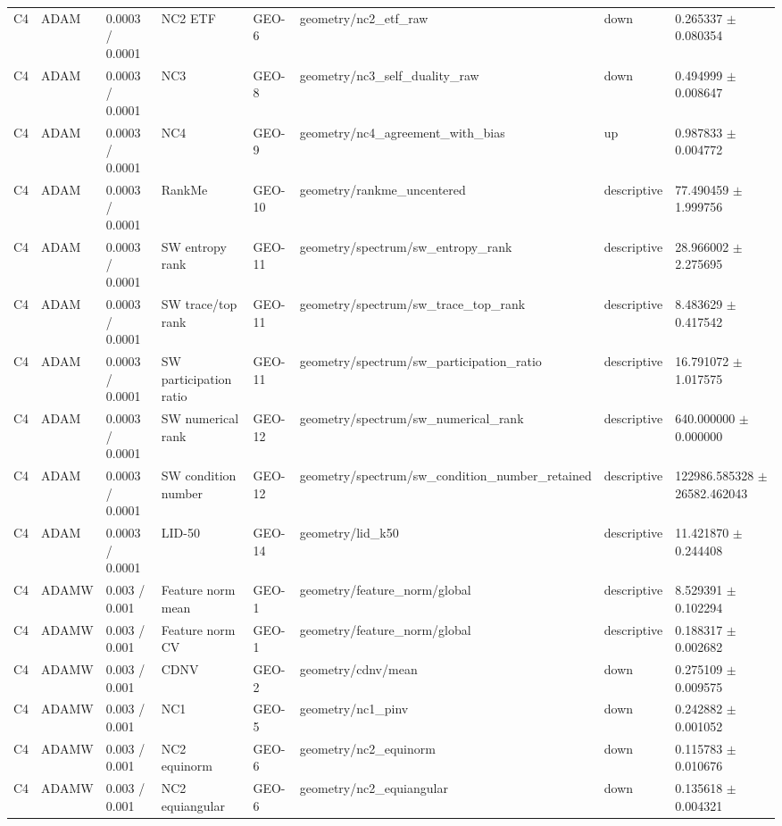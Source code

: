 \begin{longtable}{llllllll}
C4 & ADAM & 0.0003 / 0.0001 & NC2 ETF & GEO-6 & geometry/nc2\_etf\_raw & down & 0.265337 $\pm$ 0.080354 \\
C4 & ADAM & 0.0003 / 0.0001 & NC3 & GEO-8 & geometry/nc3\_self\_duality\_raw & down & 0.494999 $\pm$ 0.008647 \\
C4 & ADAM & 0.0003 / 0.0001 & NC4 & GEO-9 & geometry/nc4\_agreement\_with\_bias & up & 0.987833 $\pm$ 0.004772 \\
C4 & ADAM & 0.0003 / 0.0001 & RankMe & GEO-10 & geometry/rankme\_uncentered & descriptive & 77.490459 $\pm$ 1.999756 \\
C4 & ADAM & 0.0003 / 0.0001 & SW entropy rank & GEO-11 & geometry/spectrum/sw\_entropy\_rank & descriptive & 28.966002 $\pm$ 2.275695 \\
C4 & ADAM & 0.0003 / 0.0001 & SW trace/top rank & GEO-11 & geometry/spectrum/sw\_trace\_top\_rank & descriptive & 8.483629 $\pm$ 0.417542 \\
C4 & ADAM & 0.0003 / 0.0001 & SW participation ratio & GEO-11 & geometry/spectrum/sw\_participation\_ratio & descriptive & 16.791072 $\pm$ 1.017575 \\
C4 & ADAM & 0.0003 / 0.0001 & SW numerical rank & GEO-12 & geometry/spectrum/sw\_numerical\_rank & descriptive & 640.000000 $\pm$ 0.000000 \\
C4 & ADAM & 0.0003 / 0.0001 & SW condition number & GEO-12 & geometry/spectrum/sw\_condition\_number\_retained & descriptive & 122986.585328 $\pm$ 26582.462043 \\
C4 & ADAM & 0.0003 / 0.0001 & LID-50 & GEO-14 & geometry/lid\_k50 & descriptive & 11.421870 $\pm$ 0.244408 \\
C4 & ADAMW & 0.003 / 0.001 & Feature norm mean & GEO-1 & geometry/feature\_norm/global & descriptive & 8.529391 $\pm$ 0.102294 \\
C4 & ADAMW & 0.003 / 0.001 & Feature norm CV & GEO-1 & geometry/feature\_norm/global & descriptive & 0.188317 $\pm$ 0.002682 \\
C4 & ADAMW & 0.003 / 0.001 & CDNV & GEO-2 & geometry/cdnv/mean & down & 0.275109 $\pm$ 0.009575 \\
C4 & ADAMW & 0.003 / 0.001 & NC1 & GEO-5 & geometry/nc1\_pinv & down & 0.242882 $\pm$ 0.001052 \\
C4 & ADAMW & 0.003 / 0.001 & NC2 equinorm & GEO-6 & geometry/nc2\_equinorm & down & 0.115783 $\pm$ 0.010676 \\
C4 & ADAMW & 0.003 / 0.001 & NC2 equiangular & GEO-6 & geometry/nc2\_equiangular & down & 0.135618 $\pm$ 0.004321 \\

\end{longtable}
